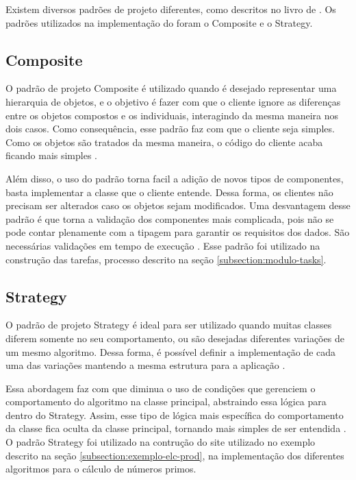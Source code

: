 \documentclass[12pt]{tcc}
\begin{document}
	Existem diversos padrões de projeto diferentes, como descritos no livro de \cite{gamma1994design}. Os padrões utilizados na implementação do  foram o Composite e o Strategy.

	\subsection{Composite}
	\label{subsection:composite}

	O padrão de projeto Composite é utilizado quando é desejado representar uma hierarquia de objetos, e o objetivo é fazer com que o cliente ignore as diferenças entre os objetos compostos e os individuais, interagindo da mesma maneira nos dois casos. Como consequência, esse padrão faz com que o cliente seja simples. Como os objetos são tratados da mesma maneira, o código do cliente acaba ficando mais simples \citep[Capítulo 4]{gamma1994design}.
	
	Além disso, o uso do padrão torna facil a adição de novos tipos de componentes, basta implementar a classe que o cliente entende. Dessa forma, os clientes não precisam ser alterados caso os objetos sejam modificados. Uma desvantagem desse padrão é que torna a validação dos componentes mais complicada, pois não se pode contar plenamente com a tipagem para garantir os requisitos dos dados. São necessárias validações em tempo de execução \citep[Capítulo 4]{gamma1994design}. Esse padrão foi utilizado na construção das tarefas, processo descrito na seção \ref{subsection:modulo-tasks}.

	\subsection{Strategy}
	\label{subsection:strategy}

	O padrão de projeto Strategy é ideal para ser utilizado quando muitas classes diferem somente no seu comportamento, ou são desejadas diferentes variações de um mesmo algoritmo. Dessa forma, é possível definir a implementação de cada uma das variações mantendo a mesma estrutura para a aplicação \citep{gamma1994design}. 

	Essa abordagem faz com que diminua o uso de condições que gerenciem o comportamento do algoritmo na classe principal, abstraindo essa lógica para dentro do Strategy. Assim, esse tipo de lógica mais específica do comportamento da classe fica oculta da classe principal, tornando mais simples de ser entendida  \citep{gamma1994design}. O padrão Strategy foi utilizado na contrução do site utilizado no exemplo descrito na seção \ref{subsection:exemplo-elc-prod}, na implementação dos diferentes algoritmos para o cálculo de números primos.
\end{document}
